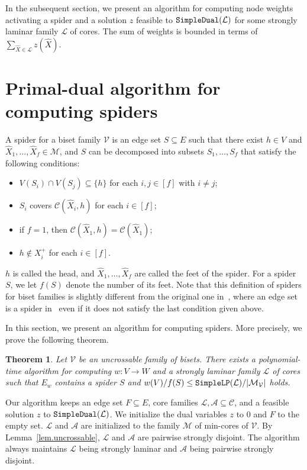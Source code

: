\documentclass[11pt]{article}
\newtheorem{theorem}{Theorem}
\newcommand{\Mfam}{\mathcal{M}}
\newcommand{\Afam}{\mathcal{A}}
\newcommand{\Cfam}{\mathcal{C}}
\newcommand{\Vfam}{\mathcal{V}}
\newcommand{\Lfam}{\mathcal{L}}
\newcommand{\CoreLP}{{\tt SimpleLP}}
\newcommand{\CoreDual}{{\tt SimpleDual}}
\begin{document}
In the subsequent section, we present an algorithm for computing
node weights activating a spider 
and a solution $z$ feasible to $\CoreDual(\Lfam)$
for some strongly laminar family $\Lfam$ of cores.
The sum of weights  is bounded in terms
of $\sum_{\hat{X}\in \Lfam}z(\hat{X})$.


\section{Primal-dual algorithm for computing spiders}
\label{sec.primal-dual}

A spider for a biset family $\Vfam$ is an edge set $S\subseteq
E$ 
such that there exist $h \in V$ and $\hat{X}_1,\ldots,\hat{X}_f \in
\Mfam$, and $S$ can be decomposed into subsets $S_1,\ldots,S_f$
that satisfy the following conditions:
\begin{itemize}
 \item $V(S_i) \cap V(S_j)\subseteq \{h\}$ for each $i,j \in [f]$ with
       $i\neq j$;
 \item $S_i$ covers $\Cfam(\hat{X}_i,h)$ for each $i \in [f]$;
 \item if $f=1$, then $\Cfam(\hat{X}_1,h)=\Cfam(\hat{X}_1)$;
 \item $h \not\in X^+_i$ for each $i \in [f]$.
\end{itemize}
$h$ is called the head, and $\hat{X}_1,\ldots,\hat{X}_f$ are called the feet of the spider.
For a spider $S$, we let $f(S)$ denote the number of its feet.
Note that this definition of spiders for biset families
is slightly different from the original one
in~\cite{Nutov12uncrossable}, where
an edge set is a spider in~\cite{Nutov12uncrossable} even if it does not
satisfy the last condition given above.



In this section, we present an algorithm for computing spiders.
More precisely, we prove the following theorem.

\begin{theorem}\label{thm.spideralgorithm}
 Let $\Vfam$ be an uncrossable family of bisets.
 There exists a polynomial-time algorithm for computing $w\colon
 V\rightarrow W$
 and a strongly laminar family $\Lfam$ of cores
 such that
 $E_w$ contains a spider $S$ and 
 $w(V)/f(S) \leq \CoreLP(\Lfam)/|\Mfam_{\Vfam}|$ holds.
\end{theorem}


Our algorithm keeps 
an edge set $F\subseteq E$, 
core families $\Lfam, \Afam\subseteq \Cfam$,
and a feasible solution $z$ to $\CoreDual(\Lfam)$.
We initialize the dual variables $z$ to $0$ and $F$ to the empty set.
$\Lfam$ and $\Afam$ are initialized to the family $\Mfam$ of min-cores of $\Vfam$.
By Lemma~\ref{lem.uncrossable}, 
$\Lfam$ and $\Afam$ are pairwise strongly disjoint.
The algorithm always
maintains $\Lfam$ being strongly laminar and $\Afam$ being pairwise strongly disjoint.
\end{document}
